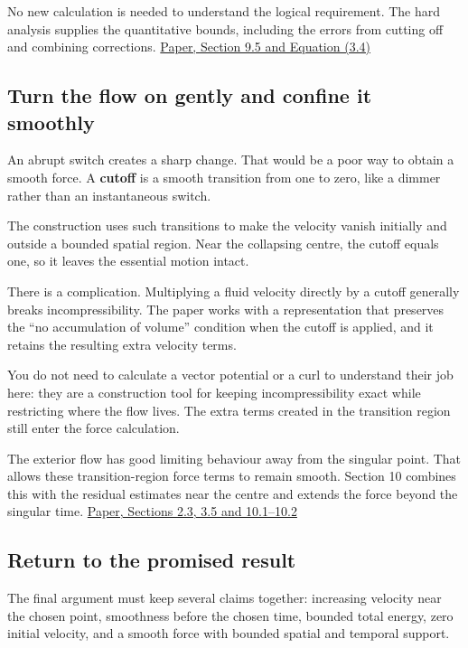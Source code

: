 \documentclass[
  english,
  11pt,
]{article}
\begin{document}
No new calculation is needed to understand the logical requirement. The
hard analysis supplies the quantitative bounds, including the errors
from cutting off and combining corrections.
\href{https://cdn.openai.com/pdf/32d9f210-8b73-45e0-91bc-82a30aef8a9a/navier-stokes.pdf}{Paper,
Section 9.5 and Equation (3.4)}

\subsection{Turn the flow on gently and confine it
smoothly}\label{turn-the-flow-on-gently-and-confine-it-smoothly}

An abrupt switch creates a sharp change. That would be a poor way to
obtain a smooth force. A \textbf{cutoff} is a smooth transition from one
to zero, like a dimmer rather than an instantaneous switch.

The construction uses such transitions to make the velocity vanish
initially and outside a bounded spatial region. Near the collapsing
centre, the cutoff equals one, so it leaves the essential motion intact.

There is a complication. Multiplying a fluid velocity directly by a
cutoff generally breaks incompressibility. The paper works with a
representation that preserves the ``no accumulation of volume''
condition when the cutoff is applied, and it retains the resulting extra
velocity terms.

You do not need to calculate a vector potential or a curl to understand
their job here: they are a construction tool for keeping
incompressibility exact while restricting where the flow lives. The
extra terms created in the transition region still enter the force
calculation.

The exterior flow has good limiting behaviour away from the singular
point. That allows these transition-region force terms to remain smooth.
Section 10 combines this with the residual estimates near the centre and
extends the force beyond the singular time.
\href{https://cdn.openai.com/pdf/32d9f210-8b73-45e0-91bc-82a30aef8a9a/navier-stokes.pdf}{Paper,
Sections 2.3, 3.5 and 10.1--10.2}

\subsection{Return to the promised
result}\label{return-to-the-promised-result}

The final argument must keep several claims together: increasing
velocity near the chosen point, smoothness before the chosen time,
bounded total energy, zero initial velocity, and a smooth force with
bounded spatial and temporal support.
\end{document}

